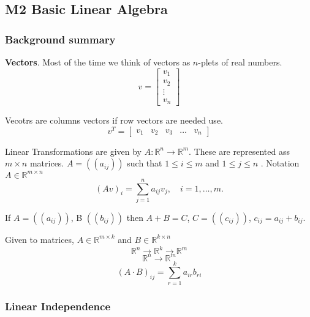 \documentclass{article}
\theoremstyle{remark}
\begin{document}
\subsection{M2 Basic Linear Algebra}%
\label{sub:m2_basic_linear_algebra}

\subsubsection{Background summary}%
\label{ssub:background_summary}

\textbf{Vectors}. Most of the time we think of vectors as $n$-plets of real numbers.\[
v = \begin{bmatrix} 
v_1 \\
v_2 \\
\vdots \\
v_n
\end{bmatrix} 
\]   

Vecotrs are columns vectors if row vectors are needed use. \[
v^{T} = \begin{bmatrix} 
  v_1 & v_2 & v_3 & \ldots & v_{n}
\end{bmatrix} 
\]    

Linear Transformations are given by $A: \mathbb{R}^{n} \to \mathbb{R}^{m}$. These are represented ass $m \times n $ matrices.  $A = \left( \left( a_{ij} \right) \right)$ such that $ 1 \le i \le m$ and $1 \le j \le n$ . Notation $A \in \mathbb{R}^{m \times n }$ \[
  (Av)_{i} = \sum_{j=1}^{n} a_{ij} v_{j}, \quad  i = 1,\ldots, m. 
\] 

If $A = \left( \left( a_{ij} \right) \right)$, B $\left( \left( b_{ij} \right) \right)$ then $A +B = C$, $C = \left(\left( c_{ij} \right)  \right)$, $c_{ij} = a_{ij} + b_{ij}$.  

\par

Given to matrices, $A \in \mathbb{R}^{m \times k }$ and $B \in \mathbb{R}^{k\times n }$ \[
\mathbb{R}^{n} \to \mathbb{R}^{k} \to\mathbb{R}^{m}
\] 
\[
\mathbb{R}^{n} \to \mathbb{R}^{m}
\] 
\[
\left( A\cdot B \right)_{ij} =  \sum_{r=1}^{k}a_{ir}b_{ri}
\] 


\subsubsection{Linear Independence}%
\label{ssub:linear_independence}
\end{document}
